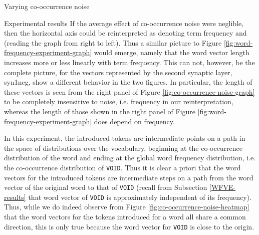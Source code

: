 \documentclass{article} %
\newcommand{\word}[1]{\texttt{#1}}
\begin{document}
\begin{section}{Varying co-occurrence noise}
\begin{subsection}{Experimental results}
If the average effect of co-occurrence noise were neglible, then the horizontal axis could be reinterpreted as
denoting term frequency and (reading the graph from right to left).
Thus a similar picture to Figure \ref{fig:word-frequency-experiment-graph} would emerge, namely that the
word vector length increases more or less linearly with term frequency.
This can not, however, be the complete picture, for the vectors
represented by the second synaptic layer, syn1neg, show a different
behavior in the two figures.  In particular, the length of these vectors
is seen from the right panel of Figure \ref{fig:co-occurrence-noise-graph}
to be completely insensitive to noise, i.e. frequency in our
reinterpretation, whereas the length of those shown in the right panel
of Figure \ref{fig:word-frequency-experiment-graph} does depend on
frequency.

In this experiment, the introduced tokens are intermediate points on a path in the space of distributions over the vocabulary, beginning at the co-occurrence distribution of the word and ending at the global word frequency distribution, i.e. the co-occurrence distribution of \word{VOID}.
Thus it is clear a priori that the word vectors for the introduced tokens are intermediate steps on a path from the word vector of the original word to that of \word{VOID} (recall from Subsection \ref{WFVE-results} that word vector of \word{VOID} is approximately independent of its frequency).
Thus, while we do indeed observe from Figure \ref{fig:co-occurrence-noise-heatmap} that the word vectors for the tokens introduced for a word all share a common direction, this is only true because the word vector for \word{VOID} is close to the origin.


\end{subsection}
\end{section}
\end{document}
